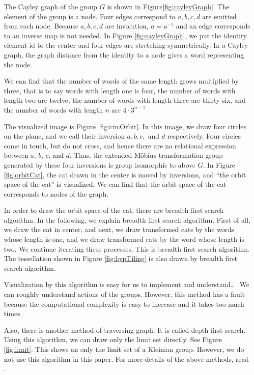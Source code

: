 The Cayley graph of the group $G$ is shown in Figure\ref{fig:cayleyGraph}. 
The element of the group is a node. Four edges correspond to 
$a, b, c, d$ are emitted from each node.
Because $a, b, c, d$ are involution, $a=a^{-1}$ and
an edge corresponds to an inverse map is not needed.
In Figure \ref{fig:cayleyGraph}, we put the identity element $\mathrm{id}$
to the center and four edges are stretching symmetrically.
In a Cayley graph, the graph distance from the identity to a node gives 
a word representing the node.

We can find that the number of words of the same length grows multiplied by three, 
that is to say words with length one is four, the number of words with length two are
twelve, the number of words with length three are thirty six, and the
number of words with length $n$ are $4 \cdot 3^{n-1}$

The visualized image is Figure \ref{fig:circOrbit}. In this image,
we draw four circles on the plane, and we call their inversion
$a, b, c,$ and $ d$ respectively. Four circles come in touch, but do not cross,
and hence there are no relational expression between $a$, $b$, $c$, and $d$.
Thus, the extended M\"obius transformation group generated by these four inversions
is group isomorphic to above $G$.
In Figure \ref{fig:orbitCat}, the cat drawn in the center is moved by
inversions, and ``the orbit space of the cat'' is visualized.
We can find that the orbit space of the cat corresponds to nodes of
the graph.

In order to draw the orbit space of the cat, there are breadth first search
algorithm.
In the following, we explain breadth first search algorithm.
First of all, we draw the cat in center, and
next, we draw transformed cats by the words whose length is one,
and we draw transformed cats by the word whose length is two.
We continue iterating these processes.
This is breadth first search algorithm.
The tessellation shown in Figure \ref{fig:hypTiling} is also drawn by
breadth first search algorithm.

Visualization by this algorithm is easy for us to implement and understand．
We can roughly understand actions of the groups.
However, this method has a fault because the computational complexity is 
easy to increase and it takes too much times.

Also, there is another method of traversing graph.
It is called depth first search.
Using this algorithm, we can draw only the limit set directly.
See Figure \ref{fig:limit}. This shows an only the limit set of a Kleinian
group.
However, we do not use this algorithm in this paper.
For more details of the above methods, read \cite{MumfordSeriesWright200204}.

